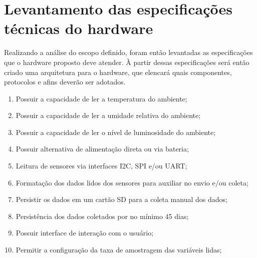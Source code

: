 
\section{Levantamento das especificações técnicas do hardware}

Realizando a análise do escopo definido, foram então levantadas as especificações que o hardware proposto deve atender. À partir dessas especificações será então criado uma arquitetura para o hardware, que elencará quais componentes, protocolos e afins deverão ser adotados.

    \begin{enumerate}
        \item Possuir a capacidade de ler a temperatura do ambiente;
        \item Possuir a capacidade de ler a umidade relativa do ambiente;
        \item Possuir a capacidade de ler o nível de luminosidade do ambiente;
        \item Possuir alternativa de alimentação direta ou via bateria;
        \item Leitura de sensores via interfaces I2C, SPI e/ou UART;
        \item Formatação dos dados lidos dos sensores para auxiliar no envio e/ou coleta;
        \item Persistir os dados em um cartão SD para a coleta manual dos dados;
        \item Persistência dos dados coletados por no mínimo 45 dias;
        \item Possuir interface de interação com o usuário;
        \item Permitir a configuração da taxa de amostragem das variáveis lidas;

\end{enumerate}
